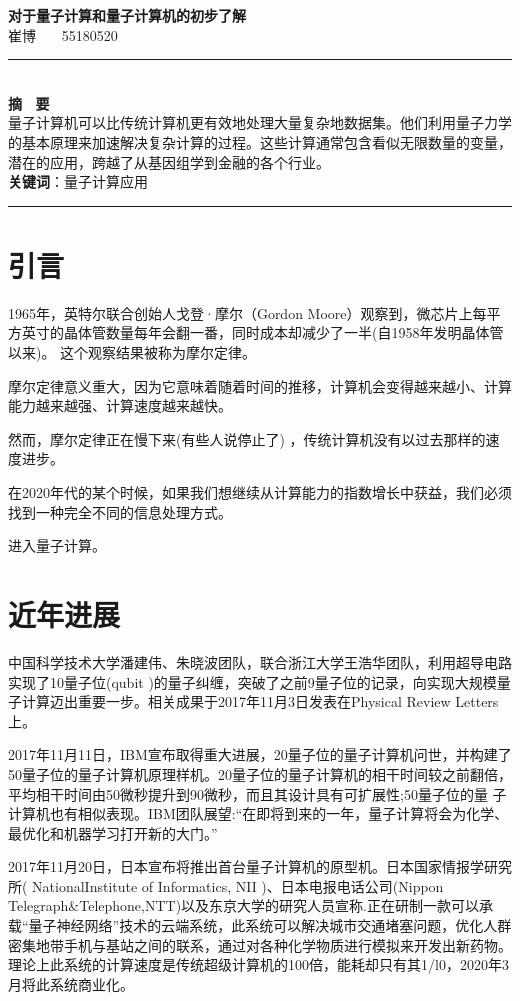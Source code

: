 \documentclass{hfutpaper}
\begin{document}
\begin{center}
\LARGE
  \textbf{对于量子计算和量子计算机的初步了解}\\
  \vspace{0.2em}
  \large
    崔博 \ \ \ 55180520 \\ %
  \end{center}
\rule[0.1\baselineskip]{\textwidth}{0.5pt}
\\
\textbf{摘 \ 要}\\
\large
量子计算机可以比传统计算机更有效地处理大量复杂地数据集。他们利用量子力学的基本原理来加速解决复杂计算的过程。这些计算通常包含看似无限数量的变量，潜在的应用，跨越了从基因组学到金融的各个行业。
\\
\textbf{关键词}：量子\quad 计算\quad 应用\\
\rule[0.1\baselineskip]{\textwidth}{0.5pt}
\section{引言}
1965年，英特尔联合创始人戈登·摩尔（Gordon Moore）观察到，微芯片上每平方英寸的晶体管数量每年会翻一番，同时成本却减少了一半(自1958年发明晶体管以来)。 这个观察结果被称为摩尔定律。

摩尔定律意义重大，因为它意味着随着时间的推移，计算机会变得越来越小、计算能力越来越强、计算速度越来越快。

然而，摩尔定律正在慢下来(有些人说停止了) ，传统计算机没有以过去那样的速度进步。

在2020年代的某个时候，如果我们想继续从计算能力的指数增长中获益，我们必须找到一种完全不同的信息处理方式。

进入量子计算。
\section{近年进展}
中国科学技术大学潘建伟、朱晓波团队，联合浙江大学王浩华团队，利用超导电路实现了10量子位(qubit )的量子纠缠，突破了之前9量子位的记录，向实现大规模量子计算迈出重要一步。相关成果于2017年11月3日发表在Physical Review
Letters上。

2017年11月11日，IBM宣布取得重大进展，20量子位的量子计算机问世，并构建了50量子位的量子计算机原理样机。20量子位的量子计算机的相干时间较之前翻倍，平均相干时间由50微秒提升到90微秒，而且其设计具有可扩展性;50量子位的量
子计算机也有相似表现。IBM团队展望:“在即将到来的一年，量子计算将会为化学、最优化和机器学习打开新的大门。”

2017年11月20日，日本宣布将推出首台量子计算机的原型机。日本国家情报学研究所( NationalInstitute of Informatics, NII )、日本电报电话公司(Nippon Telegraph\&Telephone,NTT)以及东京大学的研究人员宣称.正在研制一款可以承载“量子神经网络”技术的云端系统，此系统可以解决城市交通堵塞问题，优化人群密集地带手机与基站之间的联系，通过对各种化学物质进行模拟来开发出新药物。理论上此系统的计算速度是传统超级计算机的100倍，能耗却只有其1/l0，2020年3月将此系统商业化。
\end{document}
